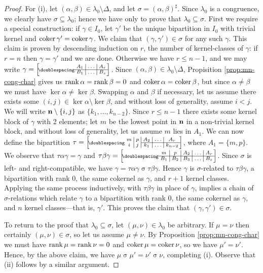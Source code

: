 \begin{lemma}
\begin{proof}
    For (i), let $(\alpha, \beta) \in \lambda_0 \setminus \Delta$, and let
    $\sigma = (\alpha, \beta)^\sharp$.  Since $\lambda_0$ is a congruence, we
    clearly have $\sigma \subseteq \lambda_0$; hence we have only to prove that
    $\lambda_0 \subseteq \sigma$.  First we require a special construction: if
    $\gamma \in I_0$, let $\gamma'$ be the unique bipartition in $I_0$ with
    trivial kernel and $\operatorname{coker}\gamma' = \operatorname{coker}\gamma$.  We claim that
    $(\gamma, \gamma') \in \sigma$ for any such $\gamma$.  This claim is proven
    by descending induction on $r$, the number of kernel-classes of $\gamma$: if
    $r = n$ then $\gamma = \gamma'$ and we are done.  Otherwise we have
    $r \leq n-1$, and we may write
    $\gamma = \bipart{c|c|c}{1-3}{A_1&\ldots&A_r}{B_1&\ldots&B_s}$.  Since
    $(\alpha,\beta) \in \lambda_0 \setminus \Delta$, Propisition
    \ref{prop:mn-cong-char} gives us $\operatorname{rank}\alpha = \operatorname{rank}\beta = 0$ and
    $\operatorname{coker}\alpha = \operatorname{coker}\beta$, but since $\alpha \neq \beta$ we must have
    $\ker\alpha \neq \ker\beta$.  Swapping $\alpha$ and $\beta$ if necessary,
    let us assume there exists some $(i,j) \in \ker\alpha \setminus \ker\beta$,
    and without loss of generality, assume $i < j$.  We will write
    $\mathbf{n} \setminus \{i,j\}$ as $\{k_1, \ldots, k_{n-2}\}$.  Since $r \leq n-1$
    there exists some kernel block of $\gamma$ with 2 elements; let $m$
    be the lowest point in $\mathbf{n}$ in a non-trivial kernel block, and without loss
    of generality, let us assume $m$ lies in $A_1$.  We can now define the
    bipartition $\tau = \bipart{c|c|c|c|c}{3-5}
    {m & p & A_2 & \ldots & A_r}
    {i & j & k_1 & \ldots & k_{n-2}}$, 
    where $A_1 = \{m, p\}$.
    We observe that $\tau \alpha \gamma = \gamma$ and
    $\tau \beta \gamma = \bipart{c|c|c|c|c}{1-5}
    {m & p & A_2 & \ldots & A_r}
    {B_1 & B_2 & B_3 & \ldots & B_s}$.
    Since $\sigma$ is left- and right-compatible, we have
    $\gamma = \tau\alpha\gamma \mathrel\sigma \tau\beta\gamma$.  Hence $\gamma$
    is $\sigma$-related to $\tau\beta\gamma$, a bipartition with rank $0$, the
    same cokernel as $\gamma$, and $r+1$ kernel classes.  Applying the same
    process inductively, with $\tau\beta\gamma$ in place of $\gamma$, implies a
    chain of $\sigma$-relations which relate $\gamma$ to a bipartition with rank
    $0$, the same cokernel as $\gamma$, and $n$ kernel classes---that is,
    $\gamma'$.  This proves the claim that $(\gamma, \gamma') \in \sigma$.

    To return to the proof that $\lambda_0 \subseteq \sigma$, let
    $(\mu, \nu) \in \lambda_0$ be arbitrary.  If $\mu = \nu$ then certainly
    $(\mu, \nu) \in \sigma$, so let us assume $\mu \neq \nu$.  By Proposition
    \ref{prop:mn-cong-char} we must have $\operatorname{rank}\mu = \operatorname{rank}\nu = 0$ and
    $\operatorname{coker}\mu = \operatorname{coker}\nu$, so we have $\mu' = \nu'$.  Hence, by the above
    claim, we have $\mu \mathrel\sigma \mu' = \nu' \mathrel\sigma \nu$,
    completing (i).  Observe that (ii) follows by a similar argument.


\end{proof}
\end{lemma}
